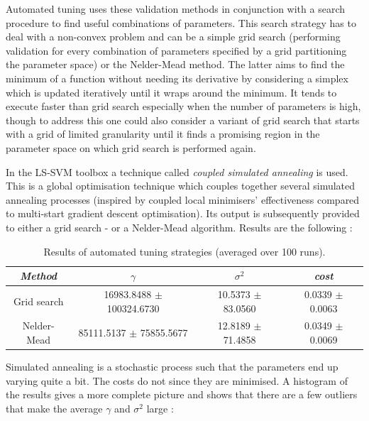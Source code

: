 \par Automated tuning uses these validation methods in conjunction with a search procedure to find useful combinations of parameters. This search strategy has to deal with a non-convex problem and can be a simple grid search (performing validation for every combination of parameters specified by a grid partitioning the parameter space) or the Nelder-Mead method. The latter aims to find the minimum of a function without needing its derivative by considering a simplex which is updated iteratively until it wraps around the minimum. It tends to execute faster than grid search especially when the number of parameters is high, though to address this one could also consider a variant of grid search that starts with a grid of limited granularity until it finds a promising region in the parameter space on which grid search is performed again.

\endgroup

\par In the LS-SVM toolbox a technique called \textit{coupled simulated annealing} is used. This is a global optimisation technique which couples together several simulated annealing processes (inspired by coupled local minimisers' effectiveness compared to multi-start gradient descent optimisation). Its output is subsequently provided to either a grid search - or a Nelder-Mead algorithm. Results are the following :

\begin{table}[h]
\centering
\begin{tabular}{c|ccc}
\textit{Method} & $\gamma$ & $\sigma^2$ & \textit{cost} \\
\hline
Grid search & 16983.8488 $\pm$ 100324.6730 & 10.5373 $\pm$ 83.0560 & 0.0339 $\pm$ 0.0063\\
Nelder-Mead & 85111.5137 $\pm$ 75855.5677 & 12.8189 $\pm$ 71.4858 & 0.0349 $\pm$ 0.0069\\
\end{tabular}
\caption{Results of automated tuning strategies (averaged over 100 runs).}
\label{automatedtuning}
\end{table}

Simulated annealing is a stochastic process such that the parameters end up varying quite a bit. The costs do not since they are minimised. A histogram of the results gives a more complete picture and shows that there are a few outliers that make the average $\gamma$ and $\sigma^2$ large :

